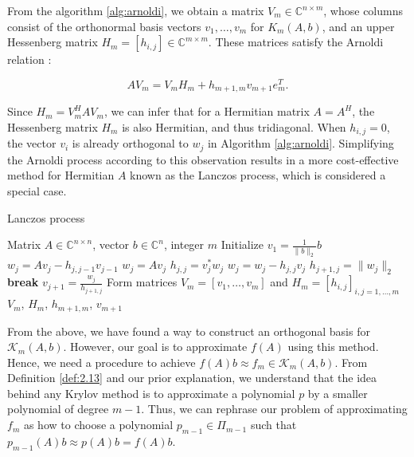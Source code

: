 From the algorithm \ref{alg:arnoldi}, we obtain a matrix $V_m \in \mathbb{C}^{n \times m}$, whose columns consist of the orthonormal basis vectors $v_1, \ldots, v_m$ for $K_m(A, b)$, and an upper Hessenberg matrix $H_m = [h_{i,j}] \in \mathbb{C}^{m \times m}$. These matrices satisfy the Arnoldi relation \cite{38}:

\begin{equation}
    AV_m = V_m H_m + h_{m+1,m} v_{m+1} e_m^T.
    \label{eq:2.25}
\end{equation}

Since \( H_m = V_m^H A V_m \), we can infer that for a Hermitian matrix \( A = A^H \), the Hessenberg matrix \( H_m \) is also Hermitian, and thus tridiagonal. When \( h_{i,j} = 0 \), the vector \( v_i \) is already orthogonal to \( w_j \) in Algorithm \ref{alg:arnoldi}. Simplifying the Arnoldi process according to this observation results in a more cost-effective method for Hermitian $A$ known as the Lanczos process, which is considered a special case.

\begin{algorithm}[H]
\caption{Lanczos process \cite{38}}
\label{alg:lanczos}
\begin{algorithmic}[1] %
\REQUIRE Matrix $A \in \mathbb{C}^{n \times n}$, vector $b \in \mathbb{C}^n$, integer $m$
\STATE Initialize $v_1 = \frac{1}{\|b\|_2} b$
        \STATE $w_j = A v_j - h_{j,j-1} v_{j-1}$
    \ELSE
        \STATE $w_j = A v_j$
    \ENDIF
    \STATE $h_{j,j} = v_j^* w_j$
    \STATE $w_j = w_j - h_{j,j} v_j$
    \STATE $h_{j+1,j} = \|w_j\|_2$
        \STATE \textbf{break}
    \ENDIF
    \STATE $v_{j+1} = \frac{w_j}{h_{j+1,j}}$
\ENDFOR
\STATE Form matrices $V_m = [v_1, \ldots, v_m]$ and $H_m = [h_{i,j}]_{i,j=1,\ldots,m}$
\RETURN $V_m$, $H_m$, $h_{m+1,m}$, $v_{m+1}$
\end{algorithmic}
\end{algorithm}

From the above, we have found a way to construct an orthogonal basis for $\mathcal{K}_m(A, b)$. However, our goal is to approximate $f(A)$ using this method. Hence, we need a procedure to achieve $f(A)b \approx f_m \in \mathcal{K}_m(A,b)$. From Definition \ref{def:2.13} and our prior explanation, we understand that the idea behind any Krylov method is to approximate a polynomial $p$ by a smaller polynomial of degree $m-1$. Thus, we can rephrase our problem of approximating $f_m$ as how to choose a polynomial $p_{m-1} \in \Pi_{m-1}$ such that $p_{m-1}(A)b \approx p(A)b = f(A)b$.

